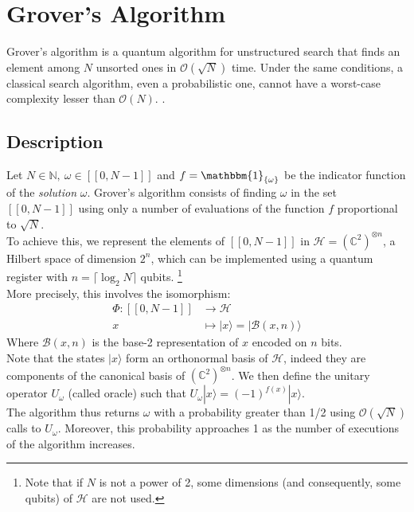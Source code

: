 \section{Grover's Algorithm}
\label{part1}

Grover's algorithm is a quantum algorithm for unstructured search that finds an element among $N$ unsorted ones in $\mathcal{O}(\sqrt{N})$ time.
Under the same conditions, a classical search algorithm, even a probabilistic one, cannot have a worst-case complexity lesser than $\mathcal{O}(N)$. \cite{grover1996fast}.

\subsection{Description}

Let $N \in \mathbb{N}, \ \omega \in [\![0, N-1]\!]$ and $f = \mathbbm{1}_{\{ \omega \}}$ be the indicator function of the \textit{solution} $\omega$.
Grover's algorithm consists of finding $\omega$ in the set $[\![0, N-1]\!]$ using only a number of evaluations of the function $f$ proportional to $\sqrt{N}$. 
\\[5pt]
To achieve this, we represent the elements of $[\![0, N-1]\!]$ in $\mathcal{H} = (\mathbb{C}^2)^{\otimes n}$, a Hilbert space of dimension $2^n$, which can be implemented using a quantum register with $n=\lceil{\log_{2} N} \rceil$ qubits.
\footnote{Note that if $N$ is not a power of 2, some dimensions (and consequently, some qubits) of $\mathcal{H}$ are not used. }
\\[5pt]
More precisely, this involves the isomorphism:
\begin{align*}
	\Phi : [\![0, N-1]\!] &\longrightarrow \mathcal{H} \\
	x &\longmapsto | x \rangle = | \mathscr{B}(x, n)\rangle
\end{align*}
Where $\mathscr{B}(x, n)$ is the base-2 representation of $x$ encoded on $n$ bits.\footnotemark
{}
\\[5pt]
Note that the states $| x \rangle$ form an orthonormal basis of $\mathcal{H}$, indeed they are components of the canonical basis of $(\mathbb{C}^2)^{\otimes n}$.
We then define the unitary operator $U_{\omega}$ (called oracle) such that $U_{\omega}|x\rangle = (-1)^{f(x)}|x\rangle$. 
\\[5pt]
The algorithm thus returns $\omega$ with a probability greater than 1/2 using $\mathcal{O}(\sqrt{N})$ calls to $U_{\omega}$. Moreover, this probability approaches 1 as the number of executions of the algorithm increases.

